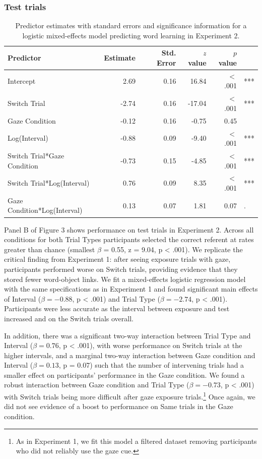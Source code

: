 \documentclass[authoryear, review]{elsarticle}
\begin{document}
\subsubsection{Test trials}\label{test-trials-1}

\begin{table}[tb]
\centering
\begin{tabular}{lrrrrl}
 Predictor & Estimate & Std. Error & $z$ value & $p$ value &  \\ 
  \hline
Intercept & 2.69 & 0.16 & 16.84 & $<$ .001 & *** \\ 
  Switch Trial & -2.74 & 0.16 & -17.04 & $<$ .001 & *** \\ 
  Gaze Condition & -0.12 & 0.16 & -0.75 & 0.45 &  \\ 
  Log(Interval) & -0.88 & 0.09 & -9.40 & $<$ .001 & *** \\ 
  Switch Trial*Gaze Condition & -0.73 & 0.15 & -4.85 & $<$ .001 & *** \\ 
  Switch Trial*Log(Interval) & 0.76 & 0.09 & 8.35 & $<$ .001 & *** \\ 
  Gaze Condition*Log(Interval) & 0.13 & 0.07 & 1.81 & 0.07 & . \\ 
   \hline
\end{tabular}
\caption{Predictor estimates with standard errors and significance information for a logistic mixed-effects model predicting word learning in Experiment 2.} 
\label{tab:exp2_reg}
\end{table}

Panel B of Figure 3 shows performance on test trials in Experiment 2.
Across all conditions for both Trial Types participants selected the
correct referent at rates greater than chance (smallest \(\beta\) =
0.55, z = 9.04, p \textless{} .001). We replicate the critical finding
from Experiment 1: after seeing exposure trials with gaze, participants
performed worse on Switch trials, providing evidence that they stored
fewer word-object links. We fit a mixed-effects logistic regression
model with the same specifications as in Experiment 1 and found
significant main effects of Interval (\(\beta = -0.88\), p \textless{}
.001) and Trial Type (\(\beta = -2.74\), p \textless{} .001).
Participants were less accurate as the interval between exposure and
test increased and on the Switch trials overall.

In addition, there was a significant two-way interaction between Trial
Type and Interval (\(\beta = 0.76\), p \textless{} .001), with worse
performance on Switch trials at the higher intervals, and a marginal
two-way interaction between Gaze condition and Interval
(\(\beta = 0.13\), p = 0.07) such that the number of intervening trials
had a smaller effect on participants' performance in the Gaze condition.
We found a robust interaction between Gaze condition and Trial Type
(\(\beta = -0.73\), p \textless{} .001) with Switch trials being more
difficult after gaze exposure
trials.\footnote{As in Experiment 1, we fit this model a filtered dataset removing participants who did not reliably use the gaze cue.}
Once again, we did not see evidence of a boost to performance on Same
trials in the Gaze condition.
\end{document}
